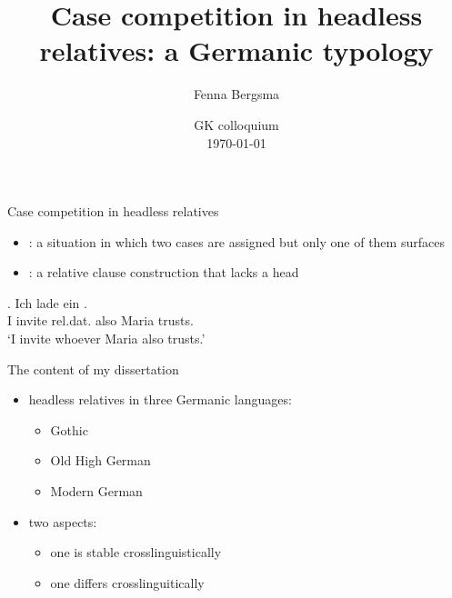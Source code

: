 \documentclass[12pt]{beamer}
\title{Case competition in headless relatives: a Germanic typology}
\author{Fenna Bergsma}
\institute{\normalsize Goethe-Universität Frankfurt}
\date{GK colloquium\\ \today}
\newcommand*{\mybox}[1]{\framebox{#1}} %
\begin{document}
\begin{frame}
\titlepage

\end{frame}

\begin{frame}{Case competition in headless relatives}
\begin{itemize}
  \item {}: a situation in which two cases are assigned but only one of them surfaces \pause
  \item {}: a relative clause construction that lacks a head \pause
\end{itemize}

\vspace{1em}

\exg. Ich {lade ein} \mybox{\tbf{wem}}   . \\
 I invite\scsub{[acc]} \ac{rel}.\ac{dat}. also Maria trusts\scsub{[dat]}.\\
 `I invite whoever Maria also trusts.' \label{ex:mg-acc-dat-intro}

\end{frame}

%

\begin{frame}{The content of my dissertation}

\begin{itemize}
  \item headless relatives in three Germanic languages:
  \begin{itemize}
    \item Gothic
    \item Old High German
    \item Modern German
  \end{itemize}\pause
  \item two aspects:
  \begin{itemize}
    \item one is stable crosslinguistically
    \item one differs crosslinguitically
  \end{itemize}
\end{itemize}

\end{frame}
\end{document}
